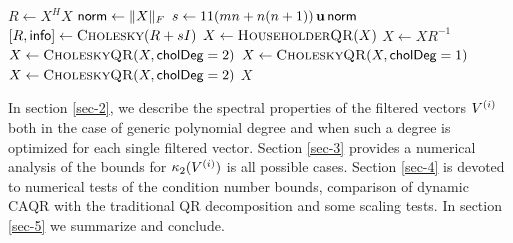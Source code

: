 \begin{algorithm}[htbp]
\caption{Dynamic CAQR selection in ChASE}\label{alg:caqr}
\begin{algorithmic}[1]
     
      \State $R \leftarrow X^H X$
      \State ${\sf norm} \leftarrow \|X\|_F$
      \State $s \leftarrow 11 (mn + n(n+1)) \, \mathbf{u} \, {\sf norm}$
      \State $[R, {\sf info}] \leftarrow \textsc{Cholesky}(R + sI)$
       
        \State $X \leftarrow \textsc{HouseholderQR}(X)$ \label{alg:line:scalapack_qr}
      \Else
        \State $X \leftarrow X R^{-1}$
        \State $X \leftarrow \textsc{CholeskyQR}(X, \textsf{cholDeg}=2)$
      \EndIf
     
      \State $X \leftarrow \textsc{CholeskyQR}(X, \textsf{cholDeg}=1)$
    \Else {}
      \State $X \leftarrow \textsc{CholeskyQR}(X, \textsf{cholDeg}=2)$
    \EndIf
    \State \Return $X$
  \EndFunction
\end{algorithmic}
\end{algorithm}

In section \ref{sec-2}, we describe the spectral properties of the filtered vectors $V^{(i)}$ both in the case of generic polynomial degree and when such a degree is optimized for each single filtered vector. Section \ref{sec-3} provides a numerical analysis of the bounds for $\mathop\mathrm{\kappa}_2\nolimits (V^{(i)})$ is all possible cases. Section \ref{sec-4} is devoted to numerical tests of the condition number bounds, comparison of dynamic CAQR with the traditional QR decomposition and some scaling tests. In section \ref{sec-5} we summarize and conclude.  

